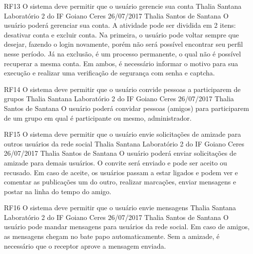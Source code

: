  \requisitoFuncional
 {RF13}
 {O sistema deve permitir que o usuário gerencie sua conta}
 {Thalia Santana}
 {Laboratório 2 do IF Goiano Ceres}
 {26/07/2017}
 {Thalia Santos de Santana}
 {O usuário poderá gerenciar sua conta. A atividade pode ser dividida em 2 itens: desativar conta e excluir conta. Na primeira, o usuário pode voltar sempre que desejar, fazendo o login novamente, porém não será possível encontrar seu perfil nesse período. Já na exclusão, é um processo permanente,  o qual não é possível recuperar a mesma conta. Em ambos, é necessário informar o motivo para sua execução e realizar uma verificação de segurança com  senha e captcha.  
 }
 
 \requisitoFuncional
 {RF14}
 {O sistema deve permitir que o usuário convide pessoas a participarem de grupos}
 {Thalia Santana}
 {Laboratório 2 do IF Goiano Ceres}
 {26/07/2017}
 {Thalia Santos de Santana}
 {O usuário poderá convidar pessoas (amigos) para participarem de um grupo em qual é participante ou mesmo, administrador.
 }
 
 \requisitoFuncional
 {RF15}
 {O sistema deve permitir que o usuário envie solicitações de amizade para outros usuários da rede social}
 {Thalia Santana}
 {Laboratório 2 do IF Goiano Ceres}
 {26/07/2017}
 {Thalia Santos de Santana}
 {O usuário poderá enviar solicitações de amizade para demais usuários. O convite será enviado e pode ser aceito ou recusado.  Em caso de aceite, os usuários passam a estar ligados e podem ver e comentar as publicações um do outro, realizar marcações, enviar mensagens e postar na linha do tempo do amigo.
 }
 
 \requisitoFuncional
 {RF16}
 {O sistema deve permitir que o  usuário envie mensagens}
 {Thalia Santana}
 {Laboratório 2 do IF Goiano Ceres}
 {26/07/2017}
 {Thalia Santos de Santana}
 {O usuário pode mandar mensagens para usuários da rede social. Em caso de amigos, as mensagens chegam no bate papo automaticamente. Sem a amizade, é necessário que o receptor aprove a mensagem enviada.
 }
 
